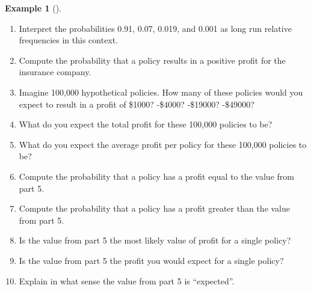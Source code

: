\documentclass[
  letterpaper,
  DIV=11,
  numbers=noendperiod]{scrreprt}
\providecommand{\tightlist}{%
  \setlength{\itemsep}{0pt}\setlength{\parskip}{0pt}}
\theoremstyle{plain}
\theoremstyle{definition}
\newtheorem{example}{Example}[chapter]
\theoremstyle{definition}
\theoremstyle{definition}
\theoremstyle{remark}
\begin{document}
\begin{tcolorbox}[enhanced jigsaw, opacityback=0, left=2mm, colframe=quarto-callout-note-color-frame, toprule=.15mm, breakable, colback=white, leftrule=.75mm, arc=.35mm, rightrule=.15mm, bottomrule=.15mm]
\begin{example}[]
\begin{enumerate}
\def\labelenumi{\arabic{enumi}.}
\tightlist
\item
  Interpret the probabilities 0.91, 0.07, 0.019, and 0.001 as long run
  relative frequencies in this context.
\item
  Compute the probability that a policy results in a positive profit for
  the insurance company.
\item
  Imagine 100,000 hypothetical policies. How many of these policies
  would you expect to result in a profit of \$1000? -\$4000? -\$19000?
  -\$49000?
\item
  What do you expect the total profit for these 100,000 policies to be?
\item
  What do you expect the average profit per policy for these 100,000
  policies to be?
\item
  Compute the probability that a policy has a profit equal to the value
  from part 5.
\item
  Compute the probability that a policy has a profit greater than the
  value from part 5.
\item
  Is the value from part 5 the most likely value of profit for a single
  policy?
\item
  Is the value from part 5 the profit you would expect for a single
  policy?
\item
  Explain in what sense the value from part 5 is ``expected''.
\end{enumerate}

\end{example}

\end{tcolorbox}
\end{document}
